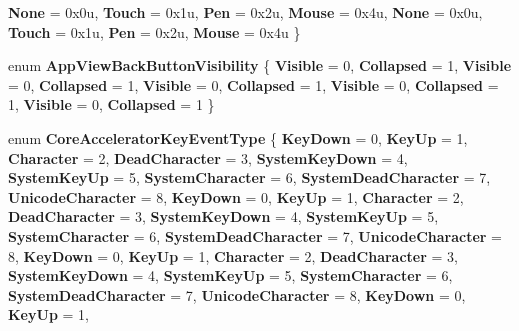 \begin{DoxyCompactItemize}
\newline
{\bfseries None} = 0x0u, 
{\bfseries Touch} = 0x1u, 
{\bfseries Pen} = 0x2u, 
{\bfseries Mouse} = 0x4u, 
\newline
{\bfseries None} = 0x0u, 
{\bfseries Touch} = 0x1u, 
{\bfseries Pen} = 0x2u, 
{\bfseries Mouse} = 0x4u
 \}
\item 
\mbox{\label{namespace_windows_1_1_u_i_1_1_core_a8126ec99b9eece4bc7dfad594e5fa9a6}} 
enum {\bfseries App\+View\+Back\+Button\+Visibility} \{ \newline
{\bfseries Visible} = 0, 
{\bfseries Collapsed} = 1, 
{\bfseries Visible} = 0, 
{\bfseries Collapsed} = 1, 
\newline
{\bfseries Visible} = 0, 
{\bfseries Collapsed} = 1, 
{\bfseries Visible} = 0, 
{\bfseries Collapsed} = 1, 
\newline
{\bfseries Visible} = 0, 
{\bfseries Collapsed} = 1
 \}
\item 
\mbox{\label{namespace_windows_1_1_u_i_1_1_core_a3b4a4c6a338426f7356d6fbe21e0541e}} 
enum {\bfseries Core\+Accelerator\+Key\+Event\+Type} \{ \newline
{\bfseries Key\+Down} = 0, 
{\bfseries Key\+Up} = 1, 
{\bfseries Character} = 2, 
{\bfseries Dead\+Character} = 3, 
\newline
{\bfseries System\+Key\+Down} = 4, 
{\bfseries System\+Key\+Up} = 5, 
{\bfseries System\+Character} = 6, 
{\bfseries System\+Dead\+Character} = 7, 
\newline
{\bfseries Unicode\+Character} = 8, 
{\bfseries Key\+Down} = 0, 
{\bfseries Key\+Up} = 1, 
{\bfseries Character} = 2, 
\newline
{\bfseries Dead\+Character} = 3, 
{\bfseries System\+Key\+Down} = 4, 
{\bfseries System\+Key\+Up} = 5, 
{\bfseries System\+Character} = 6, 
\newline
{\bfseries System\+Dead\+Character} = 7, 
{\bfseries Unicode\+Character} = 8, 
{\bfseries Key\+Down} = 0, 
{\bfseries Key\+Up} = 1, 
\newline
{\bfseries Character} = 2, 
{\bfseries Dead\+Character} = 3, 
{\bfseries System\+Key\+Down} = 4, 
{\bfseries System\+Key\+Up} = 5, 
\newline
{\bfseries System\+Character} = 6, 
{\bfseries System\+Dead\+Character} = 7, 
{\bfseries Unicode\+Character} = 8, 
{\bfseries Key\+Down} = 0, 
\newline
{\bfseries Key\+Up} = 1, 

\end{DoxyCompactItemize}
